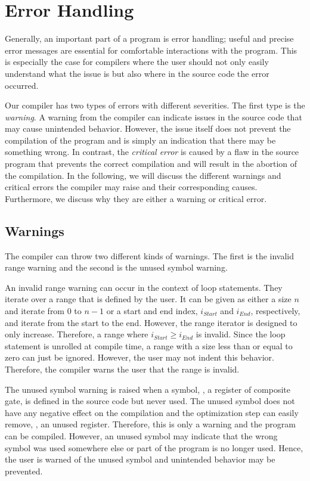 \section{Error Handling}
Generally, an important part of a program is error handling; useful and precise error messages are essential for comfortable interactions with the program. This is especially the case for compilers where the user should not only easily understand what the issue is but also where in the source code the error occurred.  

Our compiler has two types of errors with different severities. The first type is the \emph{warning}. A warning from the compiler can indicate issues in the source code that may cause unintended behavior. However, the issue itself does not prevent the compilation of the program and is simply an indication that there may be something wrong. In contrast, the \emph{critical error} is caused by a flaw in the source program that prevents the correct compilation and will result in the abortion of the compilation. In the following, we will discuss the different warnings and critical errors the compiler may raise and their corresponding causes. Furthermore, we discuss why they are either a warning or critical error. 

\subsection{Warnings}
The compiler can throw two different kinds of warnings. The first is the invalid range warning and the second is the unused symbol warning.

An invalid range warning can occur in the context of loop statements. They iterate over a range that is defined by the user. It can be given as either a size $n$ and iterate from $0$ to $n-1$ or a start and end index, $i_{Start}$ and $i_{End}$, respectively, and iterate from the start to the end. However, the range iterator is designed to only increase. Therefore, a range where $i_{Start} \geq i_{End}$ is invalid. Since the loop statement is unrolled at compile time, a range with a size less than or equal to zero can just be ignored. However, the user may not indent this behavior. Therefore, the compiler warns the user that the range is invalid.

The unused symbol warning is raised when a symbol, \eg, a register of composite gate, is defined in the source code but never used. The unused symbol does not have any negative effect on the compilation and the optimization step can easily remove, \eg, an unused register. Therefore, this is only a warning and the program can be compiled. However, an unused symbol may indicate that the wrong symbol was used somewhere else or part of the program is no longer used. Hence, the user is warned of the unused symbol and unintended behavior may be prevented.

